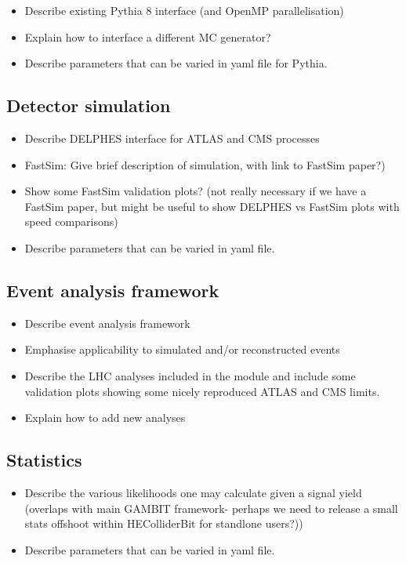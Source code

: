 \documentclass[11pt,a4paper]{article}
\begin{document}
\begin{itemize}
\item Describe existing Pythia 8 interface (and OpenMP parallelisation)
\item Explain how to interface a different MC generator?
\item Describe parameters that can be varied in yaml file for Pythia.
\end{itemize}

\subsection{Detector simulation}

\begin{itemize}
\item Describe DELPHES interface for ATLAS and CMS processes
\item FastSim: Give brief description of simulation, with link to FastSim paper?)
\item Show some FastSim validation plots? (not really necessary if we have a FastSim paper, but might be useful to show DELPHES vs FastSim plots with speed comparisons)
\item Describe parameters that can be varied in yaml file.
\end{itemize}

\subsection{Event analysis framework}

\begin{itemize}
\item Describe event analysis framework
\item Emphasise applicability to simulated and/or reconstructed events
\item Describe the LHC analyses included in the module and include some validation plots showing some nicely reproduced ATLAS and CMS limits.
\item Explain how to add new analyses
\end{itemize}

\subsection{Statistics}

\begin{itemize}
\item Describe the various likelihoods one may calculate given a signal yield (overlaps with main GAMBIT framework- perhaps we need to release a small stats offshoot within HEColliderBit for standlone users?))
\item Describe parameters that can be varied in yaml file.
\end{itemize}
\end{document}
